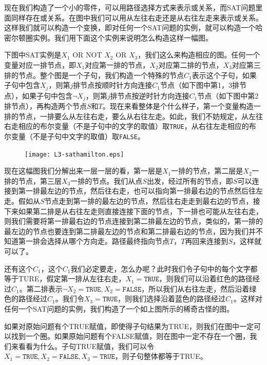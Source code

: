 现在我们构造了一个小的零件，可以用路径选择方式来表示或关系，而SAT问题里面同样存在或关系。在图中我们可以用从左往右走还是从右往左走来表示或关系。这样我们就可以构造一个变换，即对任何一个SAT问题的实例，就可以构造一个哈密尔顿圈实例。我们用下面这个实例来说明怎么构造这样一幅图。

下图中SAT实例是$X_1$ OR NOT $X_2$ OR $X_3$，我们这么来构造相应的图。任何一个变量对应一排节点，即$X_1$对应第一排的节点，$X_2$对应第二排的节点，$X_3$对应第三排的节点。整个图是一个子句，我们构造一个特殊的节点$C_1$表示这个子句，如果子句中包含$X_j$，则第$j$排节点按顺时针方向连接$C_1$节点（如下图中第1，3排节点），如果子句中包含$\neg X_j$，则第$j$排节点按逆时针方向连接$C_1$节点（如下图中第2排节点），再构造两个节点$S$和$T$。现在来看整体是个什么样子，第一个变量构造一排的节点，一排要么从左往右走，要么从右往左走。如此，我们不妨规定，从左往右走相应的布尔变量（不是子句中的文字的取值）取\texttt{TRUE}，从右往左走相应的布尔变量（不是子句中文字的取值）取\texttt{FALSE}。

\begin{figure}[H]
\centering
 \texttt{[image: L3-sathamilton.eps]}
\end{figure}

现在这幅图我们分解出来一层一层的看，第一层是$X_1$一排的节点，第二层是$X_2$一排的节点，第三层$X_3$一排的节点。我们从点$S$出发，经过所有的节点，即$S$可以连接到第一排最左边的节点，然后往右走，也可以指向第一排最右边的节点然后往左走。假如从$S$节点走到第一排的最左边的节点，然后往右走走到最右边的节点，接下来如果第二排是从右往左走则直接连接下面的节点，下一排也可能从左往右走，则我们需要将第一排最右边的节点连接到第二排最左边的节点，类似的，第一排的最左边的节点也要连到第二排最左边的节点和第二排最右边的节点，因为我们并不知道第一排会选择从哪个方向走。路径最终指向节点$T$，$T$再回来连接到$S$，这样就可以了。

还有这个$C_1$，这个$C_1$我们必定要走，怎么办呢？此时我们令子句中的每个文字都等于TURE，假定第一排从左往右走，$X_1 = \texttt{TRUE}$，则我们可以沿着红色的路径经过$C_1$。第二排表示$\neg X_2 = \texttt{TRUE},X_2 = \texttt{FALSE}$，所以我们从右往左走，然后沿着绿色的路径经过$C_1$。我们令$X_3 = \texttt{TRUE}$，则我们选择沿着蓝色的路径经过$C_1$。这样对任何一个SAT问题的实例，我们构造了一个如上图所示的稀奇古怪的图。

如果对原始问题有个TRUE赋值，即使得子句结果为TRUE，则我们在图中一定可以找到一个圈。如果原始问题有个FALSE赋值，则在图中一定不存在一个圈，我们来看看为什么。子句TRUE赋值，我们可以令$X_1 = \texttt{TRUE}, X_2 = \texttt{FALSE}, X_3 = \texttt{TRUE}$，则子句整体都等于TRUE。

